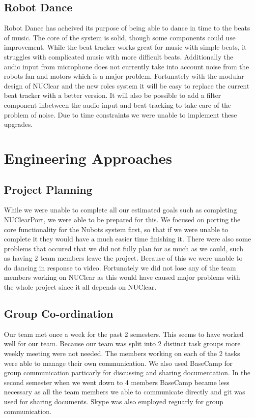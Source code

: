 \documentclass[a4paper]{article}
\begin{document}
	\subsection{Robot Dance}
			Robot Dance has acheived its purpose of being able to dance in time to the beats of music. The core of the system is solid, though some components could use improvement. While the beat tracker works great for music with simple beats, it struggles with complicated music with more difficult beats. Additionally the audio input from microphone does not currently take into account noise from the robots fan and motors which is a major problem. Fortunately with the modular design of NUClear and the new roles system it will be easy to replace the current beat tracker with a better version. It will also be possible to add a filter component inbetween the audio input and beat tracking to take care of the problem of noise. Due to time constraints we were unable to implement these upgrades.
\section{Engineering Approaches}
	\subsection{Project Planning}
		While we were unable to complete all our estimated goals such as completing NUClearPort, we were able to be prepared for this. We focused on porting the core functionality for the Nubots system first, so that if we were unable to complete it they would have a much easier time finishing it. There were also some problems that occured that we did not fully plan for as much as we could, such as having 2 team members leave the project. Because of this we were unable to do dancing in response to video. Fortunately we did not lose any of the team members working on NUClear as this would have caused major problems with the whole project since it all depends on NUClear.
	\subsection{Group Co-ordination}
		Our team met once a week for the past 2 semesters. This seems to have worked well for our team. Because our team was split into 2 distinct task groups more weekly meeting were not needed. The members working on each of the 2 tasks were able to manage their own communication. We also used BaseCamp for group communication particarly for discussing and sharing documentation. In the second semester when we went down to 4 members BaseCamp became less necessary as all the team members we able to communicate directly and git was used for sharing documents. Skype was also employed reguarly for group communication.
\end{document}
